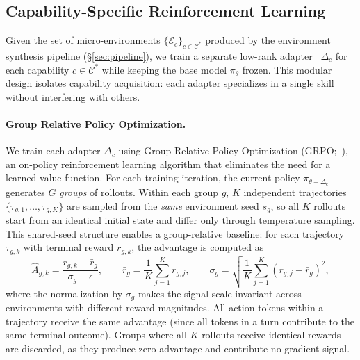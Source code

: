 \subsection{Capability-Specific Reinforcement Learning}
\label{sec:training}

Given the set of micro-environments $\{\mathcal{E}_c\}_{c \in \mathcal{C}^{*}}$
produced by the environment synthesis pipeline (\S\ref{sec:pipeline}), we train
a separate low-rank adapter~\citep{hu2022lora} $\Delta_c$ for each capability
$c \in \mathcal{C}^{*}$ while keeping the base model $\pi_\theta$ frozen.  This
modular design isolates capability acquisition: each adapter specializes in a
single skill without interfering with others.

\paragraph{Group Relative Policy Optimization.}
We train each adapter $\Delta_c$ using Group Relative Policy Optimization
(GRPO;~\citealt{shao2024deepseekmath}), an on-policy reinforcement learning
algorithm that eliminates the need for a learned value function.  For each
training iteration, the current policy $\pi_{\theta + \Delta_c}$ generates
$G$ \emph{groups} of rollouts.  Within each group $g$, $K$ independent
trajectories $\{\tau_{g,1}, \dots, \tau_{g,K}\}$ are sampled from the
\emph{same} environment seed $s_g$, so all $K$ rollouts start from an
identical initial state and differ only through temperature sampling.  This
shared-seed structure enables a group-relative baseline: for each trajectory
$\tau_{g,k}$ with terminal reward $r_{g,k}$, the advantage is computed as
\begin{equation}
    \hat{A}_{g,k} = \frac{r_{g,k} - \bar{r}_g}{\sigma_g + \epsilon},
    \qquad
    \bar{r}_g = \frac{1}{K} \sum_{j=1}^{K} r_{g,j},
    \qquad
    \sigma_g = \sqrt{\frac{1}{K}\sum_{j=1}^K (r_{g,j} - \bar{r}_g)^2},
\end{equation}
where the normalization by $\sigma_g$ makes the signal scale-invariant across
environments with different reward magnitudes.  All action tokens within a
trajectory receive the same advantage (since all tokens in a turn contribute to
the same terminal outcome).  Groups where all $K$ rollouts receive
identical rewards are discarded, as they produce zero advantage and contribute
no gradient signal.

